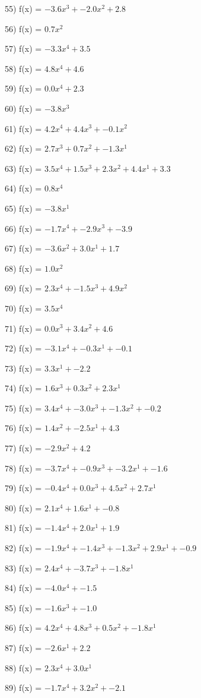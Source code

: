 \documentclass[10pt,a4paper]{article}
\begin{document}
55) f(x) = $-3.6x^3 + -2.0x^2 + 2.8$

56) f(x) = $0.7x^2$

57) f(x) = $-3.3x^4 + 3.5$

58) f(x) = $4.8x^4 + 4.6$

59) f(x) = $0.0x^4 + 2.3$

60) f(x) = $-3.8x^3$

61) f(x) = $4.2x^4 + 4.4x^3 + -0.1x^2$

62) f(x) = $2.7x^3 + 0.7x^2 + -1.3x^1$

63) f(x) = $3.5x^4 + 1.5x^3 + 2.3x^2 + 4.4x^1 + 3.3$

64) f(x) = $0.8x^4$

65) f(x) = $-3.8x^1$

66) f(x) = $-1.7x^4 + -2.9x^3 + -3.9$

67) f(x) = $-3.6x^2 + 3.0x^1 + 1.7$

68) f(x) = $1.0x^2$

69) f(x) = $2.3x^4 + -1.5x^3 + 4.9x^2$

70) f(x) = $3.5x^4$

71) f(x) = $0.0x^3 + 3.4x^2 + 4.6$

72) f(x) = $-3.1x^4 + -0.3x^1 + -0.1$

73) f(x) = $3.3x^1 + -2.2$

74) f(x) = $1.6x^3 + 0.3x^2 + 2.3x^1$

75) f(x) = $3.4x^4 + -3.0x^3 + -1.3x^2 + -0.2$

76) f(x) = $1.4x^2 + -2.5x^1 + 4.3$

77) f(x) = $-2.9x^2 + 4.2$

78) f(x) = $-3.7x^4 + -0.9x^3 + -3.2x^1 + -1.6$

79) f(x) = $-0.4x^4 + 0.0x^3 + 4.5x^2 + 2.7x^1$

80) f(x) = $2.1x^4 + 1.6x^1 + -0.8$

81) f(x) = $-1.4x^4 + 2.0x^1 + 1.9$

82) f(x) = $-1.9x^4 + -1.4x^3 + -1.3x^2 + 2.9x^1 + -0.9$

83) f(x) = $2.4x^4 + -3.7x^3 + -1.8x^1$

84) f(x) = $-4.0x^4 + -1.5$

85) f(x) = $-1.6x^3 + -1.0$

86) f(x) = $4.2x^4 + 4.8x^3 + 0.5x^2 + -1.8x^1$

87) f(x) = $-2.6x^1 + 2.2$

88) f(x) = $2.3x^4 + 3.0x^1$

89) f(x) = $-1.7x^4 + 3.2x^2 + -2.1$
\end{document}
